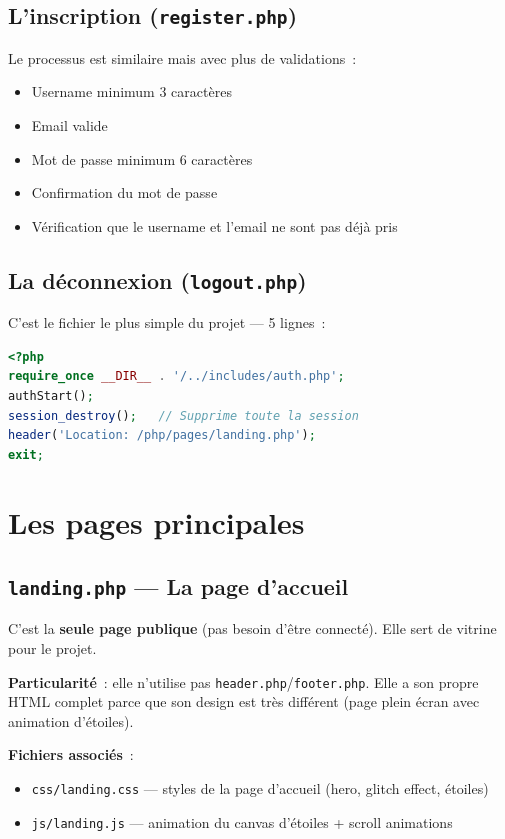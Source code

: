 \documentclass[12pt,a4paper]{article}
\begin{document}
\subsection{L'inscription (\texttt{register.php})}

Le processus est similaire mais avec plus de validations~:
\begin{itemize}
    \item Username minimum 3 caractères
    \item Email valide
    \item Mot de passe minimum 6 caractères
    \item Confirmation du mot de passe
    \item Vérification que le username et l'email ne sont pas déjà pris
\end{itemize}

\subsection{La déconnexion (\texttt{logout.php})}

C'est le fichier le plus simple du projet --- 5 lignes~:
\begin{lstlisting}[language=PHP]
<?php
require_once __DIR__ . '/../includes/auth.php';
authStart();
session_destroy();   // Supprime toute la session
header('Location: /php/pages/landing.php');
exit;
\end{lstlisting}

\section{Les pages principales}

\subsection{\texttt{landing.php} --- La page d'accueil}

C'est la \textbf{seule page publique} (pas besoin d'être connecté). Elle sert de vitrine pour le projet.

\textbf{Particularité}~: elle n'utilise pas \texttt{header.php}/\texttt{footer.php}. Elle a son propre HTML complet parce que son design est très différent (page plein écran avec animation d'étoiles).

\textbf{Fichiers associés}~:
\begin{itemize}
    \item \texttt{css/landing.css} --- styles de la page d'accueil (hero, glitch effect, étoiles)
    \item \texttt{js/landing.js} --- animation du canvas d'étoiles + scroll animations
\end{itemize}
\end{document}
